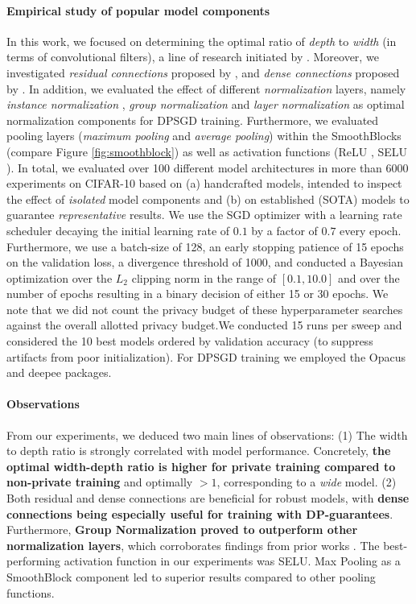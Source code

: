 \documentclass[nohyperref]{article}
\theoremstyle{plain}
\theoremstyle{definition}
\theoremstyle{remark}
\begin{document}
\paragraph{Empirical study of popular model components}
In this work, we focused on determining the optimal ratio of \textit{depth} to \textit{width} (in terms of convolutional filters), a line of research initiated by \citet{tan2019efficientnet}. Moreover, we investigated \textit{residual connections} proposed by \citet{he2016deep}, and \textit{dense connections} proposed by \cite{huang2017densely}. In addition, we evaluated the effect of different \textit{normalization} layers, namely \textit{instance normalization} \cite{ulyanov2016instance}, \textit{group normalization} \cite{wu2018group} and \textit{layer normalization} \cite{ba2016layer} as optimal normalization components for \acs{DPSGD} training. Furthermore, we evaluated pooling layers (\textit{maximum pooling} and \textit{average pooling}) within the SmoothBlocks (compare Figure \ref{fig:smoothblock}) as well as activation functions (ReLU \cite{nair2010rectified}, SELU \cite{klambauer2017self}). In total, we evaluated over 100 different model architectures in more than 6000 experiments on CIFAR-10 based on (a) handcrafted models, intended to inspect the effect of \textit{isolated} model components and (b) on established (SOTA) models to guarantee \textit{representative} results. We use the SGD optimizer with a learning rate scheduler decaying the initial learning rate of $0.1$ by a factor of $0.7$ every epoch. Furthermore, we use a batch-size of 128, an early stopping patience of 15 epochs on the validation loss, a divergence threshold of 1000, and conducted a Bayesian optimization over the $L_2$ clipping norm in the range of $[0.1, 10.0]$ and over the number of epochs resulting in a binary decision of either 15 or 30 epochs. We note that we did not count the privacy budget of these hyperparameter searches against the overall allotted privacy budget.We conducted 15 runs per sweep and considered the 10 best models ordered by validation accuracy (to suppress artifacts from poor initialization). For \acs{DPSGD} training we employed the Opacus \cite{Opacus} and deepee \cite{ziller2021medical} packages.


\paragraph{Observations}
From our experiments, we deduced two main lines of observations: (1) The width to depth ratio is strongly correlated with model performance. Concretely, \textbf{the optimal width-depth ratio is higher for private training compared to non-private training} and optimally $>1$, corresponding to a \textit{wide} model. (2) Both residual and dense connections are beneficial for robust models, with \textbf{dense connections being especially useful for training with DP-guarantees}. Furthermore, \textbf{Group Normalization proved to outperform other normalization layers}, which corroborates findings from prior works \cite{klause2022differentially, de2022unlocking}. The best-performing activation function in our experiments was SELU. Max Pooling as a SmoothBlock component led to superior results compared to other pooling functions. 
\end{document}
